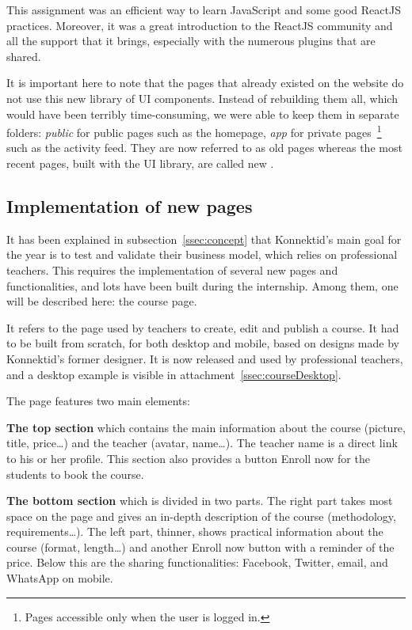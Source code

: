 This assignment was an efficient way to learn JavaScript and some good ReactJS practices. Moreover, it was a great introduction to the ReactJS community and all the support that it brings, especially with the numerous plugins that are shared.

It is important here to note that the pages that already existed on the website do not use this new library of UI components. Instead of rebuilding them all, which would have been terribly time-consuming, we were able to keep them in separate folders: \textit{public} for public pages such as the homepage, \textit{app} for private pages~\footnote{Pages accessible only when the user is logged in.} such as the activity feed. They are now referred to as \guillemotleft{} old \guillemotright{} pages whereas the most recent pages, built with the UI library, are called \guillemotleft{} new \guillemotright{}.

\subsection{Implementation of new pages}
\label{ssec:new_pages}

It has been explained in {\sc subsection}~\ref{ssec:concept} that Konnektid's main goal for the year is to test and validate their business model, which relies on
professional teachers. This requires the implementation of several new pages and functionalities, and lots have been built during the internship. Among them, one will be described here: the course page.

It refers to the page used by teachers to create, edit and publish a course. It had to be built from scratch, for both desktop and mobile, based on designs
made by Konnektid's former designer. It is now released and used by professional teachers, and a desktop example is visible in {\sc attachment}~\ref{ssec:courseDesktop}.

The page features two main elements:

\textbf{The top section} which contains the main information about the course (picture, title, price\ldots) and the teacher (avatar, name\ldots).
The teacher name is a direct link to his or her profile. This section also provides a button \guillemotleft{} Enroll now \guillemotright{} for the students to book the course.

\textbf{The bottom section} which is divided in two parts. The right part takes most space on the page and gives an in-depth description of the course
(methodology, requirements\ldots). The left part, thinner, shows practical information about the course (format, length\ldots) and another \guillemotleft{} Enroll now \guillemotright{} button with a reminder of the price. Below this are the sharing functionalities: Facebook, Twitter,
email, and WhatsApp on mobile.

